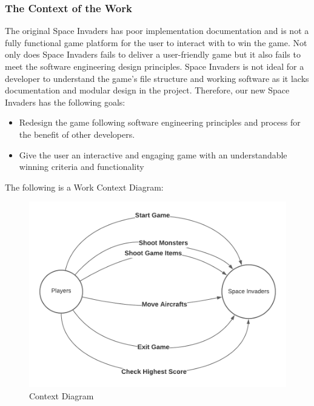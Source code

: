 \documentclass[12pt]{article}
\begin{document}
\subsubsection{The Context of the Work}
The original Space Invaders has poor implementation documentation and is not a fully functional game platform for the user to interact with to win the game. Not only does Space Invaders fails to deliver a user-friendly game but it also fails to meet the software engineering design principles. Space Invaders is not ideal for a developer to understand the game’s file structure and working software as it lacks documentation and modular design in the project. Therefore, our new Space Invaders has the following goals: 
\begin{itemize}
\item Redesign the game following software engineering principles and process for the benefit of other developers.
\item Give the user an interactive and engaging game with an understandable winning criteria and functionality
\end{itemize}
The following is a Work Context Diagram:
\begin{figure}[h!]
\begin{center}
\includegraphics[scale=1]{Context_Diagram.png}
\end{center}
\caption{Context Diagram}
\end{figure}
\newpage
\end{document}
